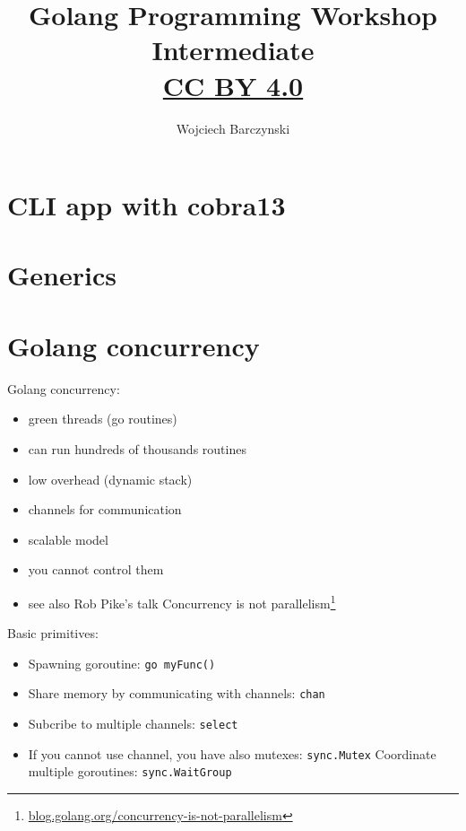 \documentclass[11pt, letterpaper]{article}
\title{Golang Programming Workshop\\Intermediate\\{ \small \href{https://creativecommons.org/licenses/by/4.0/}{CC BY 4.0} }  }
\author{Wojciech Barczynski}
\date{}
\begin{document}

\begin{titlepage}
\maketitle
\end{titlepage}

\tableofcontents
\pagebreak

\section{{\small CLI} app with cobra13}

\section{Generics}

\section{Golang concurrency}

Golang concurrency:\begin{itemize}
\item green threads (go routines)
\item can run hundreds of thousands routines
\item low overhead (dynamic stack)
\item channels for communication
\item scalable model
\item you cannot control them
\item see also Rob Pike’s talk Concurrency is not parallelism\footnote{\href{https://blog.golang.org/concurrency-is-not-parallelism}{blog.golang.org/concurrency-is-not-parallelism}}
\end{itemize}

Basic primitives: \begin{itemize}
\item Spawning goroutine: \texttt{go myFunc()}
\item Share memory by communicating with channels: \texttt{chan}
\item Subcribe to multiple channels: \texttt{select}
\item If you cannot use channel, you have also mutexes: \texttt{sync.Mutex}
Coordinate multiple goroutines: \texttt{sync.WaitGroup}
\end{itemize}
\end{document}
